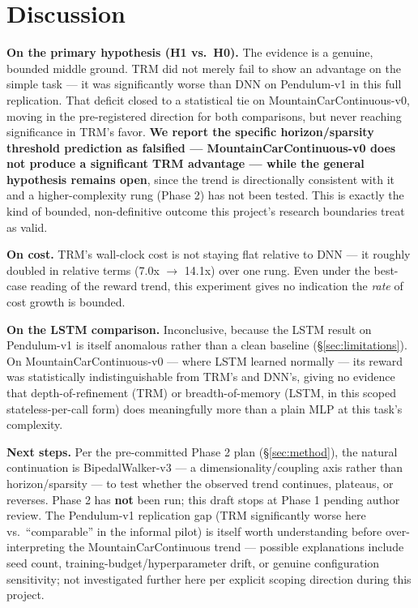 \documentclass[11pt]{article}
\begin{document}
\section{Discussion}

\textbf{On the primary hypothesis (H1 vs.\ H0).} The evidence is a genuine, bounded middle ground. TRM did not merely fail to show an advantage on the simple task --- it was significantly worse than DNN on Pendulum-v1 in this full replication. That deficit closed to a statistical tie on MountainCarContinuous-v0, moving in the pre-registered direction for both comparisons, but never reaching significance in TRM's favor. \textbf{We report the specific horizon/sparsity threshold prediction as falsified --- MountainCarContinuous-v0 does not produce a significant TRM advantage --- while the general hypothesis remains open}, since the trend is directionally consistent with it and a higher-complexity rung (Phase 2) has not been tested. This is exactly the kind of bounded, non-definitive outcome this project's research boundaries treat as valid.

\textbf{On cost.} TRM's wall-clock cost is not staying flat relative to DNN --- it roughly doubled in relative terms (7.0x $\to$ 14.1x) over one rung. Even under the best-case reading of the reward trend, this experiment gives no indication the \emph{rate} of cost growth is bounded.

\textbf{On the LSTM comparison.} Inconclusive, because the LSTM result on Pendulum-v1 is itself anomalous rather than a clean baseline (\S\ref{sec:limitations}). On MountainCarContinuous-v0 --- where LSTM learned normally --- its reward was statistically indistinguishable from TRM's and DNN's, giving no evidence that depth-of-refinement (TRM) or breadth-of-memory (LSTM, in this scoped stateless-per-call form) does meaningfully more than a plain MLP at this task's complexity.

\textbf{Next steps.} Per the pre-committed Phase 2 plan (\S\ref{sec:method}), the natural continuation is BipedalWalker-v3 --- a dimensionality/coupling axis rather than horizon/sparsity --- to test whether the observed trend continues, plateaus, or reverses. Phase 2 has \textbf{not} been run; this draft stops at Phase 1 pending author review. The Pendulum-v1 replication gap (TRM significantly worse here vs.\ ``comparable'' in the informal pilot) is itself worth understanding before over-interpreting the MountainCarContinuous trend --- possible explanations include seed count, training-budget/hyperparameter drift, or genuine configuration sensitivity; not investigated further here per explicit scoping direction during this project.
\end{document}
